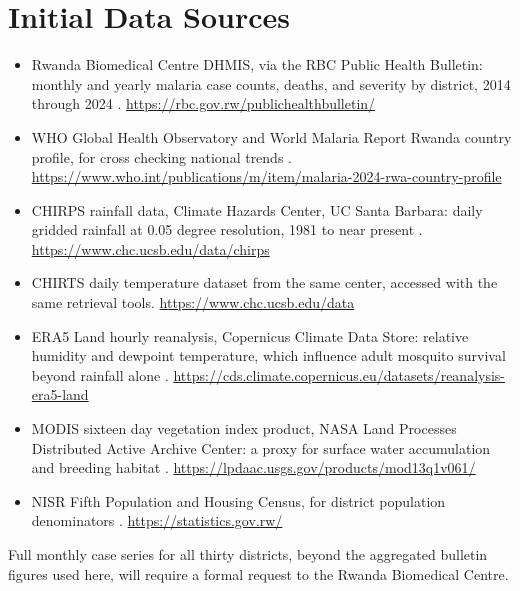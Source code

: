 \documentclass[11pt]{article}
\begin{document}
\section{Initial Data Sources}
\begin{itemize}
\item Rwanda Biomedical Centre DHMIS, via the RBC Public Health Bulletin: monthly and yearly malaria case counts, deaths, and severity by district, 2014 through 2024 \cite{rbc2024}. \url{https://rbc.gov.rw/publichealthbulletin/}
\item WHO Global Health Observatory and World Malaria Report Rwanda country profile, for cross checking national trends \cite{who2024}. \url{https://www.who.int/publications/m/item/malaria-2024-rwa-country-profile}
\item CHIRPS rainfall data, Climate Hazards Center, UC Santa Barbara: daily gridded rainfall at 0.05 degree resolution, 1981 to near present \cite{funk2015}. \url{https://www.chc.ucsb.edu/data/chirps}
\item CHIRTS daily temperature dataset from the same center, accessed with the same retrieval tools. \url{https://www.chc.ucsb.edu/data}
\item ERA5 Land hourly reanalysis, Copernicus Climate Data Store: relative humidity and dewpoint temperature, which influence adult mosquito survival beyond rainfall alone \cite{munozsabater2021}. \url{https://cds.climate.copernicus.eu/datasets/reanalysis-era5-land}
\item MODIS sixteen day vegetation index product, NASA Land Processes Distributed Active Archive Center: a proxy for surface water accumulation and breeding habitat \cite{didan2020}. \url{https://lpdaac.usgs.gov/products/mod13q1v061/}
\item NISR Fifth Population and Housing Census, for district population denominators \cite{nisr2022}. \url{https://statistics.gov.rw/}
\end{itemize}
Full monthly case series for all thirty districts, beyond the aggregated bulletin figures used here, will require a formal request to the Rwanda Biomedical Centre.
\end{document}

